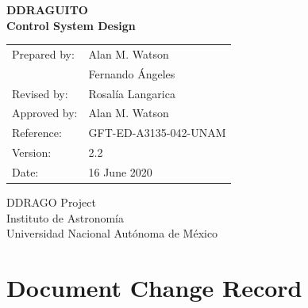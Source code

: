 \documentclass{article}
\begin{document}
\pagestyle{empty}

\pagestyle{empty}

\begin{center}
\Large \bfseries 
DDRAGUITO\\
Control System Design
\end{center}

\begin{center}
\begin{tabular}{ll}
Prepared by:&Alan M. Watson\\
&Fernando Ángeles\\
Revised by:&Rosalía Langarica\\
Approved by:&Alan M. Watson\\
Reference:&GFT-ED-A3135-042-UNAM\\
Version:&2.2\\
Date:&16 June 2020\\
\end{tabular}
\end{center}

\vspace{\fill}

\begin{center}
DDRAGO Project\\
Instituto de Astronomía\\
Universidad Nacional Autónoma de México
\end{center}

\newpage
\section*{Document Change Record}
\end{document}
